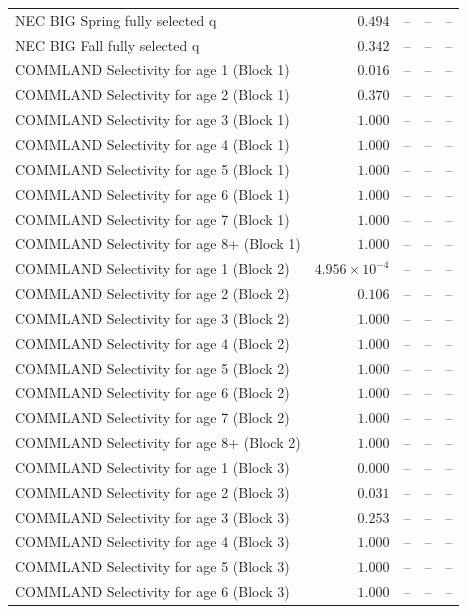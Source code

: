 \documentclass[
]{article}
\begin{document}
\begin{landscape}
\begin{longtable}[t]{lrrrr}
NEC BIG Spring fully selected q & $0.494$ & -- & -- & --\\
\addlinespace
NEC BIG Fall fully selected q & $0.342$ & -- & -- & --\\
COMMLAND Selectivity for age 1 (Block 1) & $0.016$ & -- & -- & --\\
COMMLAND Selectivity for age 2 (Block 1) & $0.370$ & -- & -- & --\\
COMMLAND Selectivity for age 3 (Block 1) & $1.000$ & -- & -- & --\\
COMMLAND Selectivity for age 4 (Block 1) & $1.000$ & -- & -- & --\\
\addlinespace
COMMLAND Selectivity for age 5 (Block 1) & $1.000$ & -- & -- & --\\
COMMLAND Selectivity for age 6 (Block 1) & $1.000$ & -- & -- & --\\
COMMLAND Selectivity for age 7 (Block 1) & $1.000$ & -- & -- & --\\
COMMLAND Selectivity for age 8+ (Block 1) & $1.000$ & -- & -- & --\\
COMMLAND Selectivity for age 1 (Block 2) & $4.956\times 10^{-4}$ & -- & -- & --\\
\addlinespace
COMMLAND Selectivity for age 2 (Block 2) & $0.106$ & -- & -- & --\\
COMMLAND Selectivity for age 3 (Block 2) & $1.000$ & -- & -- & --\\
COMMLAND Selectivity for age 4 (Block 2) & $1.000$ & -- & -- & --\\
COMMLAND Selectivity for age 5 (Block 2) & $1.000$ & -- & -- & --\\
COMMLAND Selectivity for age 6 (Block 2) & $1.000$ & -- & -- & --\\
\addlinespace
COMMLAND Selectivity for age 7 (Block 2) & $1.000$ & -- & -- & --\\
COMMLAND Selectivity for age 8+ (Block 2) & $1.000$ & -- & -- & --\\
COMMLAND Selectivity for age 1 (Block 3) & $0.000$ & -- & -- & --\\
COMMLAND Selectivity for age 2 (Block 3) & $0.031$ & -- & -- & --\\
COMMLAND Selectivity for age 3 (Block 3) & $0.253$ & -- & -- & --\\
\addlinespace
COMMLAND Selectivity for age 4 (Block 3) & $1.000$ & -- & -- & --\\
COMMLAND Selectivity for age 5 (Block 3) & $1.000$ & -- & -- & --\\
COMMLAND Selectivity for age 6 (Block 3) & $1.000$ & -- & -- & --\\

\end{longtable}
\end{landscape}
\end{document}
